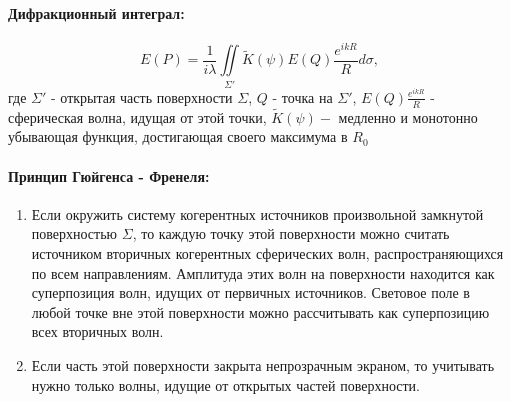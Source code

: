 \documentclass[__minimum__.tex]{subfiles}
\begin{document}
\paragraph{Дифракционный интеграл:}
$$
    E(P)
    =
    \frac{1}{i\lambda}\iint\limits_{\Sigma'} \widetilde K(\psi) E(Q)\frac{e^{ikR}}{R}d\sigma,
$$
где $\Sigma'$ - открытая часть поверхности $\Sigma$, $Q$ - точка на $\Sigma'$, $E(Q)\frac{e^{ikR}}{R}$ - сферическая волна, идущая от этой точки, $\widetilde K(\psi)-$ медленно и монотонно убывающая функция, достигающая своего максимума в $R_0$ \\
\paragraph{Принцип Гюйгенса - Френеля:}
\begin{enumerate}
    \item
          Если окружить систему когерентных источников произвольной замкнутой поверхностью $\Sigma$, то каждую точку этой поверхности можно считать источником вторичных когерентных сферических волн, распространяющихся по всем направлениям. Амплитуда этих волн на поверхности находится как суперпозиция волн, идущих от первичных источников. Световое поле в любой точке вне этой поверхности можно рассчитывать как суперпозицию всех вторичных волн.
    \item
          Если часть этой поверхности закрыта непрозрачным экраном, то учитывать нужно только волны, идущие от открытых частей поверхности.
\end{enumerate}
\end{document}
